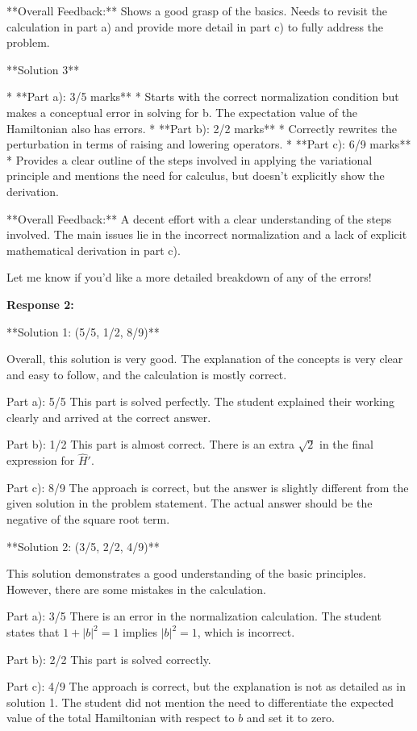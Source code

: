\documentclass[a4paper,11pt]{article}
\begin{document}
**Overall Feedback:**  Shows a good grasp of the basics. Needs to revisit the calculation in part a) and provide more detail in part c) to fully address the problem.

**Solution 3**

* **Part a): 3/5 marks**
    * Starts with the correct normalization condition but makes a conceptual error in solving for b. The expectation value of the Hamiltonian also has errors.
* **Part b): 2/2 marks**
    * Correctly rewrites the perturbation in terms of raising and lowering operators.
* **Part c): 6/9 marks**
    * Provides a clear outline of the steps involved in applying the variational principle and mentions the need for calculus, but doesn't explicitly show the derivation.

**Overall Feedback:** A decent effort with a clear understanding of the steps involved. The main issues lie in the incorrect normalization and a lack of explicit mathematical derivation in part c). 

Let me know if you'd like a more detailed breakdown of any of the errors! 

\bigskip    
\textbf{Response 2:}

**Solution 1: (5/5, 1/2, 8/9)**

Overall, this solution is very good. The explanation of the concepts is very clear and easy to follow, and the calculation is mostly correct.

Part a): 5/5
This part is solved perfectly. The student explained their working clearly and arrived at the correct answer.

Part b): 1/2
This part is almost correct. There is an extra \( \sqrt{2} \) in the final expression for \( \hat{H}' \).

Part c): 8/9
The approach is correct, but the answer is slightly different from the given solution in the problem statement. The actual answer should be the negative of the square root term.

**Solution 2: (3/5, 2/2, 4/9)**

This solution demonstrates a good understanding of the basic principles. However, there are some mistakes in the calculation.

Part a): 3/5
There is an error in the normalization calculation. The student states that \( 1 + |b|^2 = 1 \) implies \( |b|^2 = 1 \), which is incorrect.

Part b): 2/2
This part is solved correctly.

Part c): 4/9
The approach is correct, but the explanation is not as detailed as in solution 1. The student did not mention the need to differentiate the expected value of the total Hamiltonian with respect to \( b \) and set it to zero.
\end{document}
